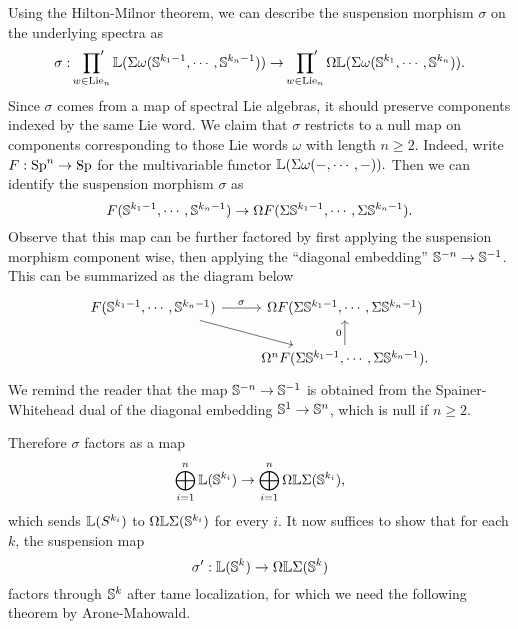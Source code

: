 Using the Hilton-Milnor theorem, we can describe the suspension morphism $\sigma$ on the underlying spectra as
$$
\sigma: 
\sideset{}{'}\prod_{w \in \operatorname{Lie}_n} {\mathbb{L}}(\Sigma \omega ({\mathbb{S}}^{k_1 -1}, \cdots, {\mathbb{S}}^{k_n -1}))
\to 
\sideset{}{'}\prod_{w \in \operatorname{Lie}_n} \Omega {\mathbb{L}}(\Sigma \omega ({\mathbb{S}}^{k_1 }, \cdots, {\mathbb{S}}^{k_n })).
$$
Since $\sigma$ comes from a map of spectral Lie algebras, it should preserve components indexed by the same Lie word.
We claim that $\sigma$ restricts to a null map on components corresponding to those Lie words $\omega$ with length $n\geq 2$. 
Indeed, write $F:\operatorname{Sp}^n \to \operatorname{Sp}$ for the multivariable functor
$
{\mathbb{L}} (\Sigma \omega(-, \cdots, -)).
$
Then we can identify the suspension morphism $\sigma$ as 
$$
F({\mathbb{S}}^{k_1 -1}, \cdots, {\mathbb{S}}^{k_n -1})
\to 
\Omega F(\Sigma {\mathbb{S}}^{k_1 -1}, \cdots, \Sigma{\mathbb{S}}^{k_n -1}).
$$
Observe that this map can be further factored by first applying the suspension morphism component wise, then applying the ``diagonal embedding'' ${\mathbb{S}}^{-n}\to {\mathbb{S}}^{-1}$. This can be summarized as the diagram below
\[
\begin{tikzcd}
     F(\BS^{k_1 -1}, \cdots, \BS^{k_n -1}) & \Omega F(\Sigma \BS^{k_1 -1}, \cdots, \Sigma\BS^{k_n -1})\\
     &     \Omega^{n} F(\Sigma \BS^{k_1 -1}, \cdots, \Sigma\BS^{k_n -1}).
     \arrow[from = 1-1, to = 1-2, "\sigma"]
     \arrow[from = 1-1, to = 2-2]
     \arrow[from = 2-2, to = 1-2, "0"]
\end{tikzcd}
\]
We remind the reader that the map ${\mathbb{S}}^{-n}\to {\mathbb{S}}^{-1}$ is obtained from the Spainer-Whitehead dual of the diagonal embedding ${\mathbb{S}}^1\to {\mathbb{S}}^{n}$, which is null if $n \geq 2$.

Therefore $\sigma$ factors as a map
$$
\bigoplus_{i=1}^{n} {\mathbb{L}}({\mathbb{S}}^{k_i}) \to 
\bigoplus_{i=1}^{n} \Omega{\mathbb{L}}\Sigma({\mathbb{S}}^{k_i}),
$$
which sends ${\mathbb{L}}(S^{k_i})$ to $\Omega{\mathbb{L}} \Sigma({\mathbb{S}}^{k_i})$ for every $i$.
It now suffices to show that for each $k$, the suspension map 
$$
\sigma':{\mathbb{L}}({\mathbb{S}}^{k}) \to 
\Omega{\mathbb{L}}\Sigma({\mathbb{S}}^{k})
$$
factors through ${\mathbb{S}}^{k}$ after tame localization, for which we need the following theorem by Arone-Mahowald.


